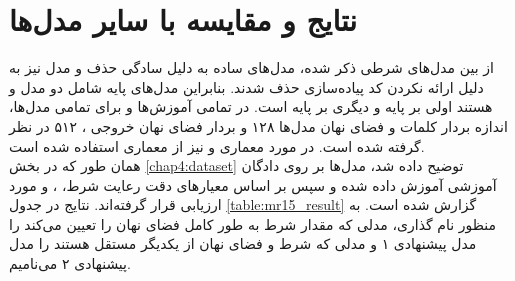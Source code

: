 \section{نتایج و مقایسه با سایر مدل‌ها}
از بین مدل‌های شرطی ذکر شده، مدل‌های ساده به دلیل سادگی حذف و مدل  نیز به دلیل ارائه نکردن کد پیاده‌سازی حذف شدند. بنابراین مدل‌های پایه شامل دو مدل \towardctg{} و \sentigan{} هستند اولی بر پایه \vae{} و دیگری بر پایه \gan{} است. در تمامی آموزش‌ها و برای تمامی مدل‌ها، اندازه بردار \embedding{} کلمات و فضای نهان مدل‌ها ۱۲۸ و بردار فضای نهان خروجی \encoder{}، ۵۱۲ در نظر گرفته شده است. در مورد معماری \encoder{} و \decoder{} نیز از معماری \transformer{} استفاده شده است.
\\
همان طور که در بخش \ref{chap4:dataset} توضیح داده شد، مدل‌ها بر روی دادگان آموزشی  آموزش داده شده و سپس بر اساس معیارهای  دقت رعایت شرط، \bleu{} ، \selfbleu{} و \jaccard{} مورد ارزیابی قرار گرفته‌اند. نتایج در جدول \ref{table:mr15_result} گزارش شده است.
به منظور نام گذاری، مدلی که مقدار شرط به طور کامل فضای نهان را تعیین می‌کند را مدل پیشنهادی ۱ و مدلی که شرط و فضای نهان از یکدیگر مستقل هستند را مدل پیشنهادی ۲ می‌نامیم.
